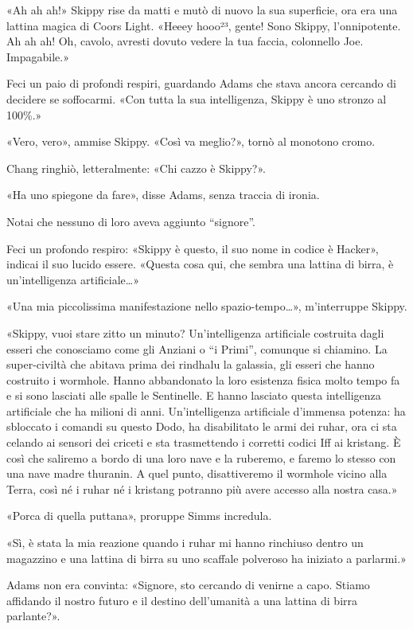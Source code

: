 «Ah ah ah!» Skippy rise da matti e mutò di nuovo la sua superficie, ora
era una lattina magica di Coors Light. «Heeey hooo²³, gente! Sono
Skippy, l'onnipotente. Ah ah ah! Oh, cavolo, avresti dovuto vedere la
tua faccia, colonnello Joe. Impagabile.»

Feci un paio di profondi respiri, guardando Adams che stava ancora
cercando di decidere se soffocarmi. «Con tutta la sua intelligenza,
Skippy è uno stronzo al 100\%.»

«Vero, vero», ammise Skippy. «Così va meglio?», tornò al monotono cromo.

Chang ringhiò, letteralmente: «Chi cazzo è Skippy?».

«Ha uno spiegone da fare», disse Adams, senza traccia di ironia.

Notai che nessuno di loro aveva aggiunto ``signore''.

Feci un profondo respiro: «Skippy è questo, il suo nome in codice è
Hacker», indicai il suo lucido essere. «Questa cosa qui, che sembra una
lattina di birra, è un'intelligenza artificiale\ldots»

«Una mia piccolissima manifestazione nello spazio-tempo\ldots»,
m'interruppe Skippy.

«Skippy, vuoi stare zitto un minuto? Un'intelligenza artificiale
costruita dagli esseri che conosciamo come gli Anziani o ``i Primi'',
comunque si chiamino. La super-civiltà che abitava prima dei rindhalu la
galassia, gli esseri che hanno costruito i wormhole. Hanno abbandonato
la loro esistenza fisica molto tempo fa e si sono lasciati alle spalle
le Sentinelle. E hanno lasciato questa intelligenza artificiale che ha
milioni di anni. Un'intelligenza artificiale d'immensa potenza: ha
sbloccato i comandi su questo Dodo, ha disabilitato le armi dei ruhar,
ora ci sta celando ai sensori dei criceti e sta trasmettendo i corretti
codici Iff ai kristang. È così che saliremo a bordo di una loro nave e
la ruberemo, e faremo lo stesso con una nave madre thuranin. A quel
punto, disattiveremo il wormhole vicino alla Terra, così né i ruhar né i
kristang potranno più avere accesso alla nostra casa.»

«Porca di quella puttana», proruppe Simms incredula.

«Sì, è stata la mia reazione quando i ruhar mi hanno rinchiuso dentro un
magazzino e una lattina di birra su uno scaffale polveroso ha iniziato a
parlarmi.»

Adams non era convinta: «Signore, sto cercando di venirne a capo. Stiamo
affidando il nostro futuro e il destino dell'umanità a una lattina di
birra parlante?».

